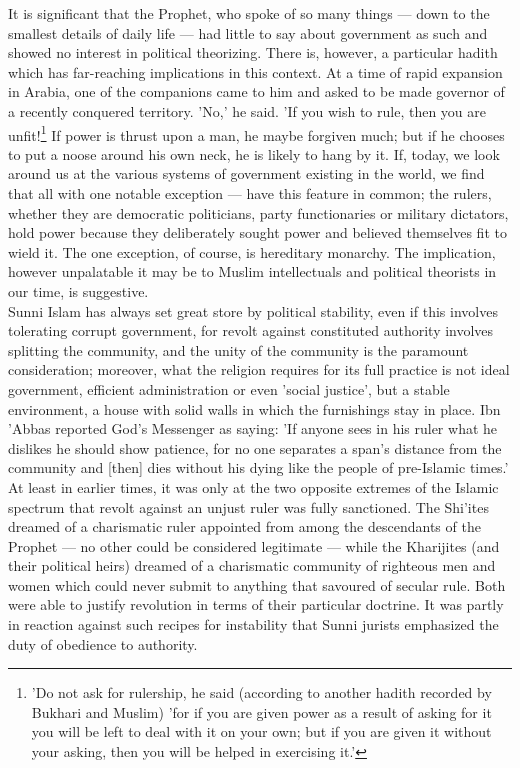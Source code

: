 \documentclass[11pt, b5paper, twoside]{book}
\begin{document}
It is significant that the Prophet, who spoke of so many things --- down to the smallest details of 
daily life --- had little to say about government as such and showed no interest in political 
theorizing. There is, however, a particular hadith which has far-reaching implications in this 
context. At a time of rapid expansion in Arabia, one of the companions came to him and asked to be 
made governor of a recently conquered territory. 'No,' he said. 'If you wish to rule, then you are 
unfit!\footnote{'Do not ask for rulership, he said (according to another hadith recorded by Bukhari and Muslim) 'for if you are given power as a result of asking for it you will be left to deal with it on your 
own; but if you are given it without your asking, then you will be helped in exercising it.'} If power is thrust upon a man, he maybe forgiven much; but if he chooses to put a noose 
around his own neck, he is likely to hang by it. If, today, we look around us at the various systems 
of government existing in the world, we find that all with one notable exception --- have this feature 
in common; the rulers, whether they are democratic politicians, party functionaries or military 
dictators, hold power because they deliberately sought power and believed themselves fit to wield it. 
The one exception, of course, is hereditary monarchy. The implication, however unpalatable it may be 
to Muslim intellectuals and political theorists in our time, is suggestive. \\

Sunni Islam has always set great store by political stability, even if this involves tolerating 
corrupt government, for revolt against constituted authority involves splitting the community, and 
the unity of the community is the paramount consideration; moreover, what the religion requires for 
its full practice is not ideal government, efficient administration or even 'social justice', but a 
stable environment, a house with solid walls in which the furnishings stay in place. Ibn 'Abbas 
reported God's Messenger as saying: 'If anyone sees in his ruler what he dislikes he should show 
patience, for no one separates a span's distance from the community and [then] dies without his dying 
like the people of pre-Islamic times.' \\

At least in earlier times, it was only at the two opposite extremes of the Islamic spectrum that 
revolt against an unjust ruler was fully sanctioned. The Shi'ites dreamed of a charismatic ruler 
appointed from among the descendants of the Prophet --- no other could be considered legitimate --- while 
the Kharijites (and their political heirs) dreamed of a charismatic community of righteous men and 
women which could never submit to anything that savoured of secular rule. Both were able to justify 
revolution in terms of their particular doctrine. It was partly in reaction against such recipes for 
instability that Sunni jurists emphasized the duty of obedience to authority. \\
\end{document}
